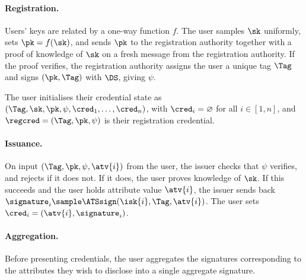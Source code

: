 \paragraph{Registration.} Users' keys are related by a one-way function $f$. The user samples $\sk$
uniformly, sets $\pk = f(\sk)$, and sends $\pk$ to the registration authority together with a proof of knowledge of $\sk$ on a
fresh message from the registration authority.
If the proof verifies, the registration authority assigns the user a unique tag
$\Tag$ and signs $(\pk, \Tag)$ with $\DS$, giving $\psi$.

The user initialises their credential state as $(\Tag, \sk, \pk, \psi, \cred_1,
\ldots, \cred_n)$, with $\cred_i = \varnothing$ for all $i \in [1,n]$, and
$\regcred = (\Tag, \pk, \psi)$ is their registration credential.

\paragraph{Issuance.} On input $(\Tag, \pk, \psi, \atv{i})$ from the user, the issuer checks that
$\psi$ verifies, and rejects if it does not.  If it does, the user proves knowledge
of $\sk$.  If this succeeds and the user holds attribute value
$\atv{i}$, the issuer sends back $\signature_i \sample \ATSsign(\isk{i},
\Tag, \atv{i})$. The user sets $\cred_i = (\atv{i}, \signature_i)$.

\paragraph{Aggregation.} Before presenting credentials, the user aggregates the
signatures corresponding to the attributes they wish to disclose into a single
aggregate signature.

